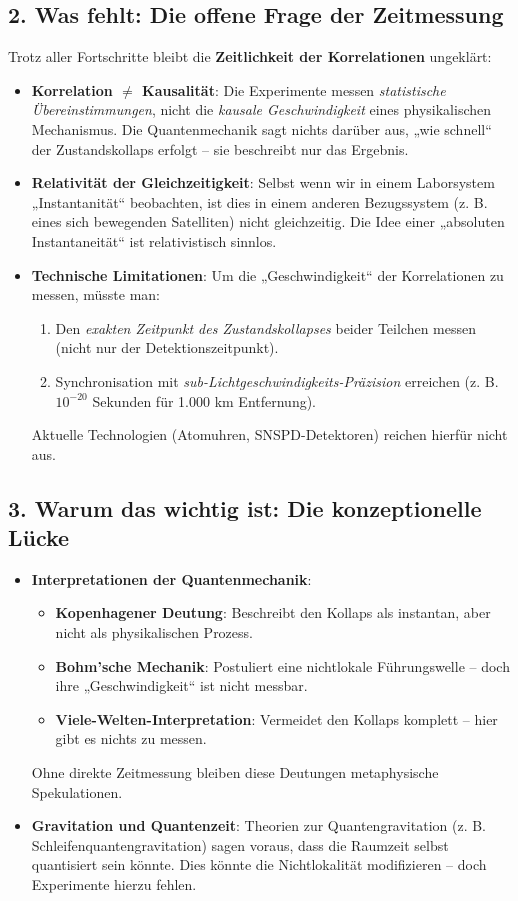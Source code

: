\documentclass[12pt,a4paper]{article}
\begin{document}
\subsection{2. Was fehlt: Die offene Frage der Zeitmessung}
Trotz aller Fortschritte bleibt die \textbf{Zeitlichkeit der Korrelationen} ungeklärt:
\begin{itemize}
    \item \textbf{Korrelation $\neq$ Kausalität}: Die Experimente messen \textit{statistische Übereinstimmungen}, nicht die \textit{kausale Geschwindigkeit} eines physikalischen Mechanismus. Die Quantenmechanik sagt nichts darüber aus, „wie schnell“ der Zustandskollaps erfolgt – sie beschreibt nur das Ergebnis.
    \item \textbf{Relativität der Gleichzeitigkeit}: Selbst wenn wir in einem Laborsystem „Instantanität“ beobachten, ist dies in einem anderen Bezugssystem (z. B. eines sich bewegenden Satelliten) nicht gleichzeitig. Die Idee einer „absoluten Instantaneität“ ist relativistisch sinnlos.
    \item \textbf{Technische Limitationen}: Um die „Geschwindigkeit“ der Korrelationen zu messen, müsste man:
    \begin{enumerate}
        \item Den \textit{exakten Zeitpunkt des Zustandskollapses} beider Teilchen messen (nicht nur der Detektionszeitpunkt).
        \item Synchronisation mit \textit{sub-Lichtgeschwindigkeits-Präzision} erreichen (z. B. $10^{-20}$ Sekunden für 1.000 km Entfernung).
    \end{enumerate}
    Aktuelle Technologien (Atomuhren, SNSPD-Detektoren) reichen hierfür nicht aus.
\end{itemize}

\subsection{3. Warum das wichtig ist: Die konzeptionelle Lücke}
\begin{itemize}
    \item \textbf{Interpretationen der Quantenmechanik}:
    \begin{itemize}
        \item \textbf{Kopenhagener Deutung}: Beschreibt den Kollaps als instantan, aber nicht als physikalischen Prozess.
        \item \textbf{Bohm’sche Mechanik}: Postuliert eine nichtlokale Führungswelle – doch ihre „Geschwindigkeit“ ist nicht messbar.
        \item \textbf{Viele-Welten-Interpretation}: Vermeidet den Kollaps komplett – hier gibt es nichts zu messen.
    \end{itemize}
    Ohne direkte Zeitmessung bleiben diese Deutungen metaphysische Spekulationen.
    \item \textbf{Gravitation und Quantenzeit}: Theorien zur Quantengravitation (z. B. Schleifenquantengravitation) sagen voraus, dass die Raumzeit selbst quantisiert sein könnte. Dies könnte die Nichtlokalität modifizieren – doch Experimente hierzu fehlen.
\end{itemize}
\end{document}
